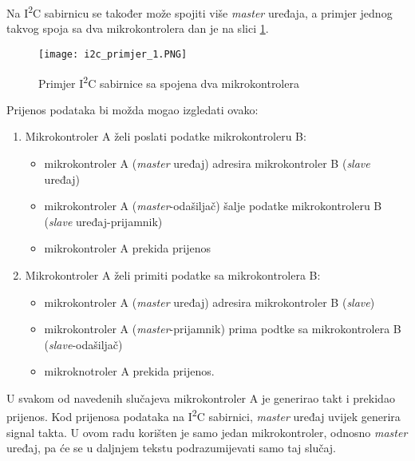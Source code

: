 Na I\textsuperscript{2}C sabirnicu se također može spojiti više \textit{master} uređaja, a primjer jednog takvog spoja sa dva mikrokontrolera dan je na slici \ref{fig:i2c_primjer_1}.
\begin{figure}[hp]
	\centering
	\texttt{[image: i2c\_primjer\_1.PNG]}
	\caption{Primjer I\textsuperscript{2}C sabirnice sa spojena dva
	mikrokontrolera \cite{i2c_manual}}
	\label{fig:i2c_primjer_1}
\end{figure}
Prijenos podataka bi možda mogao izgledati ovako:
\begin{enumerate}
	\item Mikrokontroler A želi poslati podatke mikrokontroleru B:
	\begin{itemize}
		\item mikrokontroler A (\textit{master} uređaj) adresira mikrokontroler B (\textit{slave} uređaj)
		\item mikrokontroler A (\textit{master}-odašiljač) šalje podatke mikrokontroleru B (\textit{slave} uređaj-prijamnik)
		\item mikrokontroler A prekida prijenos
	\end{itemize}
	\item Mikrokontroler A želi primiti podatke sa mikrokontrolera B:
		\begin{itemize}
		\item mikrokontroler A (\textit{master} uređaj) adresira mikrokontroler B (\textit{slave})
		\item mikrokontroler A (\textit{master}-prijamnik) prima podtke sa mikrokontrolera B (\textit{slave}-odašiljač)
		\item mikroknotroler A prekida prijenos.
	\end{itemize}
\end{enumerate}
U svakom od navedenih slučajeva mikrokontroler A je generirao takt i prekidao prijenos. Kod prijenosa podataka na I\textsuperscript{2}C sabirnici, \textit{master} uređaj uvijek generira signal takta. U ovom radu korišten je samo jedan mikrokontroler, odnosno \textit{master} uređaj, pa će se u daljnjem tekstu podrazumijevati samo taj slučaj.

